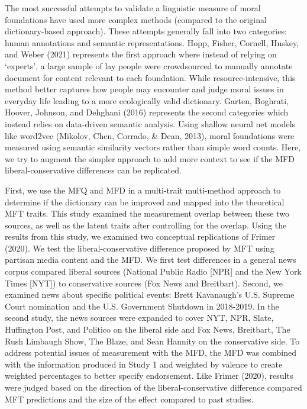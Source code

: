 \documentclass[
  man,floatsintext]{apa6}
\begin{document}
The most successful attempts to validate a linguistic measure of moral
foundations have used more complex methods (compared to the original
dictionary-based approach). These attempts generally fall into two
categories: human annotations and semantic representations. Hopp, Fisher, Cornell, Huskey, and Weber (2021)
represents the first approach where instead of relying on `experts', a
large sample of lay people were crowdsourced to manually annotate
document for content relevant to each foundation. While
resource-intensive, this method better captures how people may encounter
and judge moral issues in everyday life leading to a more ecologically
valid dictionary. Garten, Boghrati, Hoover, Johnson, and Dehghani (2016) represents the second categories which
instead relies on data-driven semantic analysis. Using shallow neural
net models like word2vec (Mikolov, Chen, Corrado, \& Dean, 2013), moral foundations
were measured using semantic similarity vectors rather than simple word
counts. Here, we try to augment the simpler approach to add more context
to see if the MFD liberal-conservative differences can be replicated.

First, we use the MFQ and MFD in a multi-trait multi-method approach to
determine if the dictionary can be improved and mapped into the
theoretical MFT traits. This study examined the measurement overlap
between these two sources, as well as the latent traits after
controlling for the overlap. Using the results from this study, we
examined two conceptual replications of Frimer (2020). We test the
liberal-conservative difference proposed by MFT using partisan media
content and the MFD. We first test differences in a general news corpus
compared liberal sources (National Public Radio {[}NPR{]} and the New York
Times {[}NYT{]}) to conservative sources (Fox News and Breitbart). Second,
we examined news about specific political events: Brett Kavanaugh's U.S.
Supreme Court nomination and the U.S. Government Shutdown in 2018-2019.
In the second study, the news sources were expanded to cover NYT, NPR,
Slate, Huffington Post, and Politico on the liberal side and Fox News,
Breitbart, The Rush Limbaugh Show, The Blaze, and Sean Hannity on the
conservative side. To address potential issues of measurement with the
MFD, the MFD was combined with the information produced in Study 1 and
weighted by valence to create weighted percentages to better specify
endorsement. Like Frimer (2020), results were judged based on the
direction of the liberal-conservative difference compared MFT
predictions and the size of the effect compared to past studies.
\end{document}
